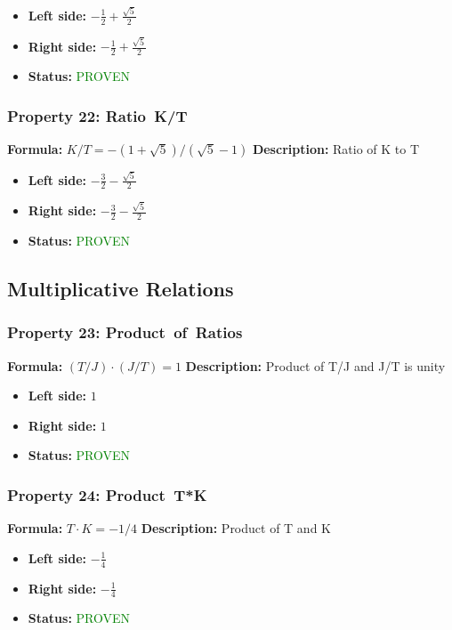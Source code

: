 \begin{itemize}
\item \textbf{Left side:} $- \frac{1}{2} + \frac{\sqrt{5}}{2}$
\item \textbf{Right side:} $- \frac{1}{2} + \frac{\sqrt{5}}{2}$
\item \textbf{Status:} \textcolor{green}{PROVEN}
\end{itemize}

\subsubsection*{Property 22: Ratio~K/T}
\textbf{Formula:} $K/T = -(1+\sqrt{5})/(\sqrt{5}-1)$
\textbf{Description:} Ratio of K to T

\begin{itemize}
\item \textbf{Left side:} $- \frac{3}{2} - \frac{\sqrt{5}}{2}$
\item \textbf{Right side:} $- \frac{3}{2} - \frac{\sqrt{5}}{2}$
\item \textbf{Status:} \textcolor{green}{PROVEN}
\end{itemize}


\subsection{Multiplicative Relations}

\subsubsection*{Property 23: Product~of~Ratios}
\textbf{Formula:} $(T/J)  \cdot  (J/T) = 1$
\textbf{Description:} Product of T/J and J/T is unity

\begin{itemize}
\item \textbf{Left side:} $1$
\item \textbf{Right side:} $1$
\item \textbf{Status:} \textcolor{green}{PROVEN}
\end{itemize}

\subsubsection*{Property 24: Product~T*K}
\textbf{Formula:} $T  \cdot  K = -1/4$
\textbf{Description:} Product of T and K

\begin{itemize}
\item \textbf{Left side:} $- \frac{1}{4}$
\item \textbf{Right side:} $- \frac{1}{4}$
\item \textbf{Status:} \textcolor{green}{PROVEN}
\end{itemize}

